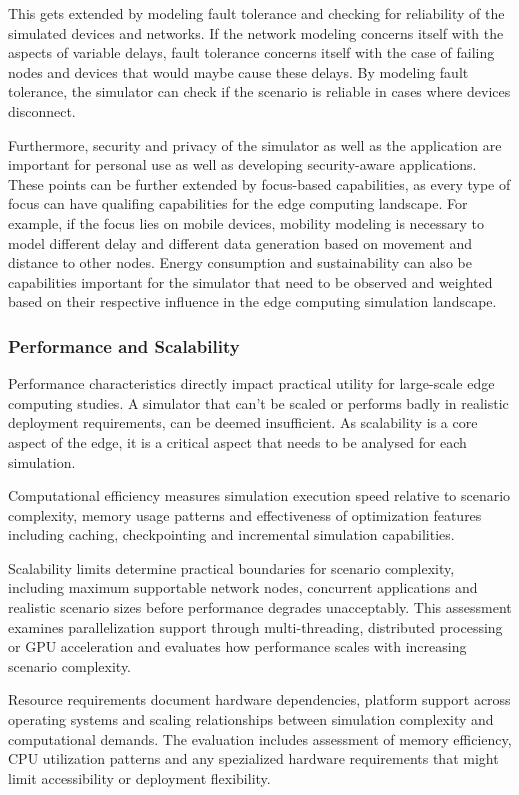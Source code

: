 This gets extended by modeling fault tolerance and checking for reliability of the simulated devices and networks.
If the network modeling concerns itself with the aspects of variable delays, fault tolerance concerns itself with the case of failing nodes and devices that would maybe cause these delays.
By modeling fault tolerance, the simulator can check if the scenario is reliable in cases where devices disconnect. 

Furthermore, security and privacy of the simulator as well as the application are important for personal use as well as developing security-aware applications.
These points can be further extended by focus-based capabilities, as every type of focus can have qualifing capabilities for the edge computing landscape.
For example, if the focus lies on mobile devices, mobility modeling is necessary to model different delay and different data generation based on movement and distance to other nodes.
Energy consumption and sustainability can also be capabilities important for the simulator that need to be observed and weighted based on their respective influence in the edge computing simulation landscape.

\subsubsection{Performance and Scalability}
Performance characteristics directly impact practical utility for large-scale edge computing studies.
A simulator that can't be scaled or performs badly in realistic deployment requirements, can be deemed insufficient.
As scalability is a core aspect of the edge, it is a critical aspect that needs to be analysed for each simulation.

Computational efficiency measures simulation execution speed relative to scenario complexity, memory usage patterns and effectiveness of optimization features including caching, checkpointing and incremental simulation capabilities.

Scalability limits determine practical boundaries for scenario complexity, including maximum supportable network nodes, concurrent applications and realistic scenario sizes before performance degrades unacceptably.
This assessment examines parallelization support through multi-threading, distributed processing or GPU acceleration and evaluates how performance scales with increasing scenario complexity.

Resource requirements document hardware dependencies, platform support across operating systems and scaling relationships between simulation complexity and computational demands.
The evaluation includes assessment of memory efficiency, CPU utilization patterns and any spezialized hardware requirements that might limit accessibility or deployment flexibility.

